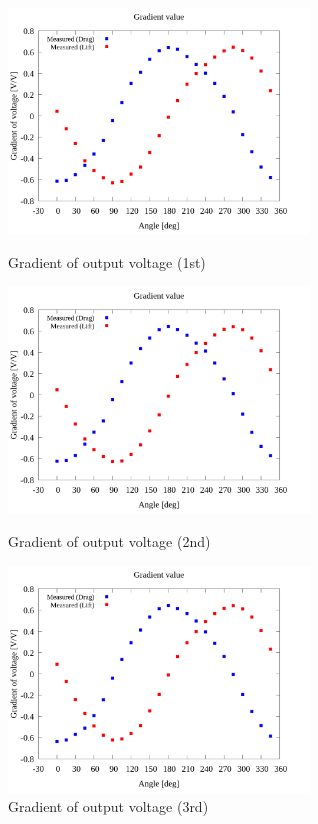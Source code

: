 \documentclass[twocolumn,a4j]{jsarticle}
\begin{document}
\begin{figure}[htbp]
    \footnotesize
    \begin{center}
        \includegraphics[width=80mm]{../../../02_workspace/result/2-1/plot/05/05_summary-wave.png}
        \caption{Gradient of output voltage (1st)}
        \includegraphics[width=80mm]{../../../02_workspace/result/2-2/plot/05/05_summary-wave.png}
        \caption{Gradient of output voltage (2nd)}
        \includegraphics[width=80mm]{../../../02_workspace/result/2-3/plot/05/05_summary-wave.png}
        \caption{Gradient of output voltage (3rd)}
    \end{center}
\end{figure}
\end{document}
